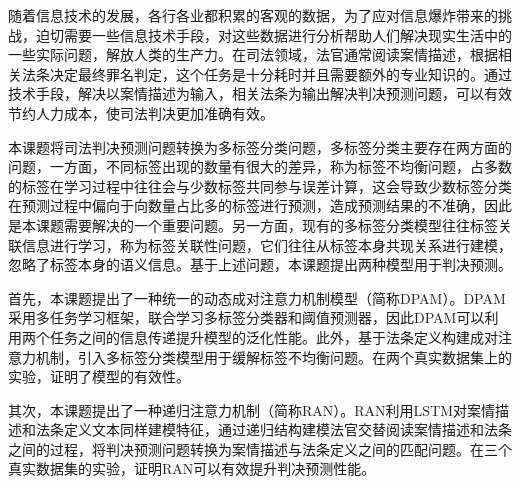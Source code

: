 \begin{cabstract}
随着信息技术的发展，各行各业都积累的客观的数据，为了应对信息爆炸带来的挑战，迫切需要一些信息技术手段，对这些数据进行分析帮助人们解决现实生活中的一些实际问题，解放人类的生产力。在司法领域，法官通常阅读案情描述，根据相关法条决定最终罪名判定，这个任务是十分耗时并且需要额外的专业知识的。通过技术手段，解决以案情描述为输入，相关法条为输出解决判决预测问题，可以有效节约人力成本，使司法判决更加准确有效。

本课题将司法判决预测问题转换为多标签分类问题，多标签分类主要存在两方面的问题，一方面，不同标签出现的数量有很大的差异，称为标签不均衡问题，占多数的标签在学习过程中往往会与少数标签共同参与误差计算，这会导致少数标签分类在预测过程中偏向于向数量占比多的标签进行预测，造成预测结果的不准确，因此是本课题需要解决的一个重要问题。另一方面，现有的多标签分类模型往往标签关联信息进行学习，称为标签关联性问题，它们往往从标签本身共现关系进行建模，忽略了标签本身的语义信息。基于上述问题，本课题提出两种模型用于判决预测。

首先，本课题提出了一种统一的动态成对注意力机制模型（简称DPAM）。DPAM采用多任务学习框架，联合学习多标签分类器和阈值预测器，因此DPAM可以利用两个任务之间的信息传递提升模型的泛化性能。此外，基于法条定义构建成对注意力机制，引入多标签分类模型用于缓解标签不均衡问题。在两个真实数据集上的实验，证明了模型的有效性。

其次，本课题提出了一种递归注意力机制（简称RAN）。RAN利用LSTM对案情描述和法条定义文本同样建模特征，通过递归结构建模法官交替阅读案情描述和法条之间的过程，将判决预测问题转换为案情描述与法条定义之间的匹配问题。在三个真实数据集的实验，证明RAN可以有效提升判决预测性能。

\end{cabstract}

